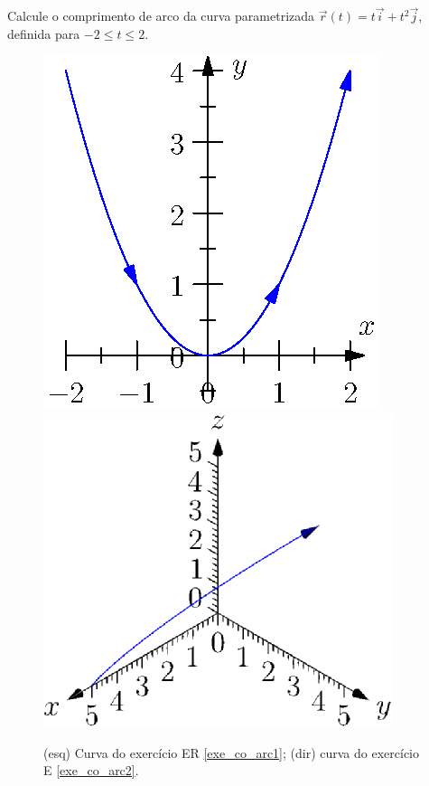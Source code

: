 \begin{exeresol} \label{exe_co_arc1}
Calcule o comprimento de arco da curva parametrizada $\vec{r}(t) = t \vec{i} + t^2 \vec{j}$, definida para $-2 \leq t \leq 2$. 
\end{exeresol}
\begin{figure}
  \centering
      \includegraphics{./cap_curvas/figs/comprimento_arco_parabola}
      \includegraphics{./cap_curvas/figs/comprimento_arco_curva}
  \caption{(esq) Curva do exercício ER \ref{exe_co_arc1}; (dir) curva do exercício E \ref{exe_co_arc2}.}\label{fig_co_arc1}
  \end{figure}
  
